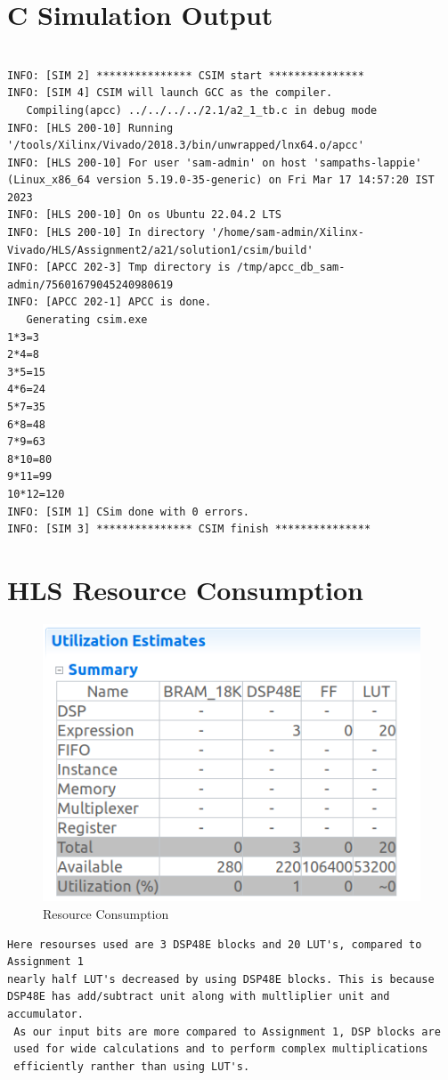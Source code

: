 \documentclass{article}
\begin{document}
\section{C Simulation Output}
\begin{lstlisting}

INFO: [SIM 2] *************** CSIM start ***************
INFO: [SIM 4] CSIM will launch GCC as the compiler.
   Compiling(apcc) ../../../../2.1/a2_1_tb.c in debug mode
INFO: [HLS 200-10] Running '/tools/Xilinx/Vivado/2018.3/bin/unwrapped/lnx64.o/apcc'
INFO: [HLS 200-10] For user 'sam-admin' on host 'sampaths-lappie' (Linux_x86_64 version 5.19.0-35-generic) on Fri Mar 17 14:57:20 IST 2023
INFO: [HLS 200-10] On os Ubuntu 22.04.2 LTS
INFO: [HLS 200-10] In directory '/home/sam-admin/Xilinx-Vivado/HLS/Assignment2/a21/solution1/csim/build'
INFO: [APCC 202-3] Tmp directory is /tmp/apcc_db_sam-admin/75601679045240980619
INFO: [APCC 202-1] APCC is done.
   Generating csim.exe
1*3=3
2*4=8
3*5=15
4*6=24
5*7=35
6*8=48
7*9=63
8*10=80
9*11=99
10*12=120
INFO: [SIM 1] CSim done with 0 errors.
INFO: [SIM 3] *************** CSIM finish ***************

\end{lstlisting}
\vspace{15cm}


\section{HLS Resource Consumption}
\vspace{3cm}
\begin{figure}[h]
    \centering
\includegraphics[width=\columnwidth]{figs/Resource_Consumption.png}
    \caption{Resource Consumption}
    \label{fig:my_label}
\end{figure}
\begin{lstlisting}
Here resourses used are 3 DSP48E blocks and 20 LUT's, compared to Assignment 1
nearly half LUT's decreased by using DSP48E blocks. This is because 
DSP48E has add/subtract unit along with multliplier unit and accumulator.
 As our input bits are more compared to Assignment 1, DSP blocks are 
 used for wide calculations and to perform complex multiplications 
 efficiently ranther than using LUT's.
\end{lstlisting}
\vspace{5cm}
\end{document}
